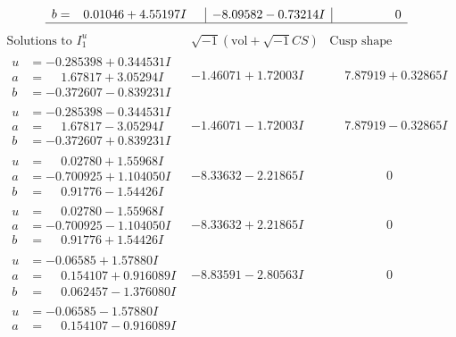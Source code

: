 \documentclass[1p]{elsarticle_modified}
\theoremstyle{definition}
\newcommand{\I}{\sqrt{-1}}
\begin{document}
$$\begin{array}{c|c|c}
\begin{aligned}
b &= \phantom{-}0.01046 + 4.55197 I\end{aligned}
 & -8.09582 - 0.73214 I & \phantom{-0.000000 } 0\\
 \hline 
 \end{array}$$\newpage$$\begin{array}{c|c|c}  
\text{Solutions to }I^u_{1}& \I (\text{vol} + \sqrt{-1}CS) & \text{Cusp shape}\\
 \hline 
\begin{aligned}
u &= -0.285398 + 0.344531 I \\
a &= \phantom{-}1.67817 + 3.05294 I \\
b &= -0.372607 - 0.839231 I\end{aligned}
 & -1.46071 + 1.72003 I & \phantom{-}7.87919 + 0.32865 I \\ \hline\begin{aligned}
u &= -0.285398 - 0.344531 I \\
a &= \phantom{-}1.67817 - 3.05294 I \\
b &= -0.372607 + 0.839231 I\end{aligned}
 & -1.46071 - 1.72003 I & \phantom{-}7.87919 - 0.32865 I \\ \hline\begin{aligned}
u &= \phantom{-}0.02780 + 1.55968 I \\
a &= -0.700925 + 1.104050 I \\
b &= \phantom{-}0.91776 - 1.54426 I\end{aligned}
 & -8.33632 - 2.21865 I & \phantom{-0.000000 } 0 \\ \hline\begin{aligned}
u &= \phantom{-}0.02780 - 1.55968 I \\
a &= -0.700925 - 1.104050 I \\
b &= \phantom{-}0.91776 + 1.54426 I\end{aligned}
 & -8.33632 + 2.21865 I & \phantom{-0.000000 } 0 \\ \hline\begin{aligned}
u &= -0.06585 + 1.57880 I \\
a &= \phantom{-}0.154107 + 0.916089 I \\
b &= \phantom{-}0.062457 - 1.376080 I\end{aligned}
 & -8.83591 - 2.80563 I & \phantom{-0.000000 } 0 \\ \hline\begin{aligned}
u &= -0.06585 - 1.57880 I \\
a &= \phantom{-}0.154107 - 0.916089 I \\

\end{aligned}
\end{array}$$
\end{document}
